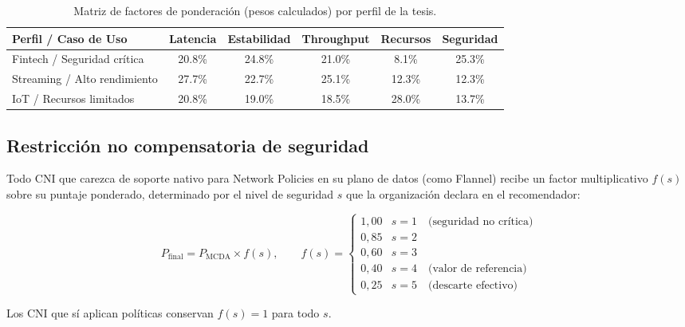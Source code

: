 \begin{table}[htbp]
\centering
\scriptsize
\caption{Matriz de factores de ponderación (pesos calculados) por perfil de la tesis.}
\label{tab:apb_pesos}
\begin{tabularx}{\textwidth}{|Y|c|c|c|c|c|}
\hline
\textbf{Perfil / Caso de Uso} & \textbf{Latencia} & \textbf{Estabilidad} & \textbf{Throughput} & \textbf{Recursos} & \textbf{Seguridad} \\
\hline
Fintech / Seguridad crítica & 20.8\% & 24.8\% & 21.0\% & 8.1\% & 25.3\% \\
\hline
Streaming / Alto rendimiento & 27.7\% & 22.7\% & 25.1\% & 12.3\% & 12.3\% \\
\hline
IoT / Recursos limitados & 20.8\% & 19.0\% & 18.5\% & 28.0\% & 13.7\% \\
\hline
\end{tabularx}
\end{table}

\subsection{Restricción no compensatoria de seguridad}
Todo CNI que carezca de soporte nativo para Network Policies en su plano de datos (como Flannel) recibe un factor multiplicativo $f(s)$ sobre su puntaje ponderado, determinado por el nivel de seguridad $s$ que la organización declara en el recomendador:

\begin{equation}
  P_{\text{final}} = P_{\text{MCDA}} \times f(s), \qquad
  f(s) =
  \begin{cases}
    1{,}00 & s = 1 \quad \text{(seguridad no crítica)} \\
    0{,}85 & s = 2 \\
    0{,}60 & s = 3 \\
    0{,}40 & s = 4 \quad \text{(valor de referencia)} \\
    0{,}25 & s = 5 \quad \text{(descarte efectivo)}
  \end{cases}
  \label{eq:penalizacion_apb}
\end{equation}

Los CNI que sí aplican políticas conservan $f(s)=1$ para todo $s$.

